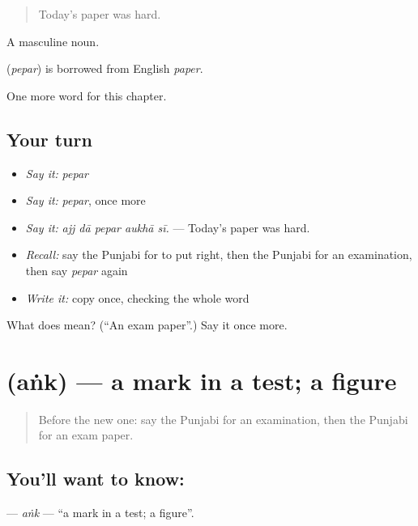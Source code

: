 \begin{quote}
Today's paper was hard.
\end{quote}

A masculine noun.

\begin{cousinweb}
\textbf{} (\emph{pepar}) is borrowed from English \emph{paper}.
\end{cousinweb}

\begin{grammarlens}[title={What you've built}]
One more word for this chapter.
\end{grammarlens}

\subsection*{Your turn}
\begin{itemize}
\raggedright
  \item \emph{Say it:} \emph{pepar}
  \item \emph{Say it:} \emph{pepar}, once more
  \item \emph{Say it:} \emph{ajj dā pepar aukhā sī.} — Today's paper was hard.
  \item \emph{Recall:} say the Punjabi for to put right, then the Punjabi for an examination, then say \emph{pepar} again
  \item \emph{Write it:} copy \textbf{} once, checking the whole word
\end{itemize}

\begin{tcolorbox}[breakable,colback=teal!4,colframe=teal!35!black,title={Before you move on}]
What does  mean? (\textquotedblleft{}An exam paper\textquotedblright{}.) Say it once more.
\end{tcolorbox}
\section[\texorpdfstring{\pa{ਅੰਕ} (aṅk)}{ਅੰਕ (aṅk)}]{ (aṅk) — a mark in a test; a figure}

\label{lesson:PA-C360-ank}



\begin{quote}
Before the new one: say the Punjabi for an examination, then the Punjabi for an exam paper.
\end{quote}

\subsection*{You'll want to know: }
\textbf{} — \emph{aṅk} — \textquotedblleft{}a mark in a test; a figure\textquotedblright{}.

